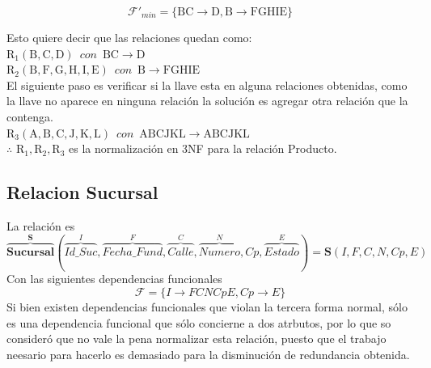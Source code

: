 \documentclass[10pt]{article}
\begin{document}
	$$\mathcal{F}'_{min}= \mathrm{\{ BC \rightarrow D, B \rightarrow FGHIE \}}$$
	
	Esto quiere decir que las relaciones quedan como: \\
	
	$\mathrm{R_1(B,C,D)}\,\,\, con \,\,\, \mathrm{ BC \rightarrow D}$\\
	$\mathrm{R_2(B,F, G, H, I, E)}\,\,\, con \,\,\, \mathrm{ B \rightarrow FGHIE}$\\
	
	El siguiente paso es verificar si la llave esta en alguna relaciones obtenidas, como la llave no aparece en ninguna relación la solución es agregar otra relación que la contenga.\\
	
	
	$\mathrm{R_3(A,B,C,J,K,L)}\,\,\, con \,\,\, \mathrm{ ABCJKL \rightarrow ABCJKL}$\\


   $\therefore \,\, \mathrm{R_1, R_2, R_3} $  es la normalización en 3NF para la relación Producto. 

   \subsection{Relacion Sucursal}
   La relación es 
   \[\overbrace{{\textbf{Sucursal}}}^{\textbf{S}} 
   (
	   \overbrace{Id\_Suc}^{I}, \overbrace{Fecha\_Fund}^{F},
	   \overbrace{Calle}^{C}, \overbrace{Numero}^{N}, Cp,
	   \overbrace{Estado}^{E}
	)
	= 
	\textbf{S}(I, F, C, N, Cp, E)
	\]
   Con las siguientes dependencias funcionales
   \[\mathcal{F} = \{I \rightarrow FCNCpE, Cp \rightarrow E\}\]
   Si bien existen dependencias funcionales que violan la tercera forma normal,
   sólo es una dependencia funcional que sólo concierne a dos atrbutos, por lo
   que so consideró que no vale la pena normalizar esta relación, puesto que el
   trabajo neesario para hacerlo es demasiado para la disminución de redundancia
   obtenida.
	
\end{document}
